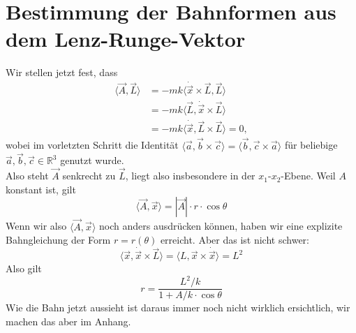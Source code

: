 \section{Bestimmung der Bahnformen aus dem Lenz-Runge-Vektor}
Wir stellen jetzt fest, dass
\begin{align*}
\langle \vec{A},\vec{L}\rangle &= -mk\langle \dot{\vec{x}} \times \vec{L}, \vec{L}\rangle\\
                              &= -mk \langle \vec{L},\dot{\vec{x}}\times \vec{L}\rangle\\
                              &= -mk \langle \dot{\vec{x}},\vec{L}\times \vec{L} \rangle = 0,
\end{align*}
wobei im vorletzten Schritt die Identität $\langle \vec{a},\vec{b}\times \vec{c} \rangle = \langle \vec{b},\vec{c}\times \vec{a}\rangle$ für beliebige $\vec{a},\vec{b},\vec{c}\in \mathbb{R}^3$ genutzt wurde.\\
Also steht $\vec{A}$ senkrecht zu $\vec{L}$, liegt also insbesondere in der $x_1$-$x_2$-Ebene. Weil $A$ konstant ist, gilt
\[
\langle \vec{A},\vec{x}\rangle = |\vec{A}|\cdot r \cdot \cos \theta
\]
Wenn wir also $\langle \vec{A},\vec{x}\rangle$ noch anders ausdrücken können, haben wir eine explizite Bahngleichung der Form $r=r(\theta)$ erreicht. Aber das ist nicht schwer:
\[
\langle \vec{x},\dot{\vec{x}}\times \vec{L}\rangle = \langle L, \vec{x}\times \dot{\vec{x}}\rangle = L^2
\]
Also gilt
\begin{equation}\label{rsol}
\boxed{ r = \frac{L^2/k}{1+A/k \cdot \cos \theta}}
\end{equation}
Wie die Bahn jetzt aussieht ist daraus immer noch nicht wirklich ersichtlich, wir machen das aber im Anhang.

